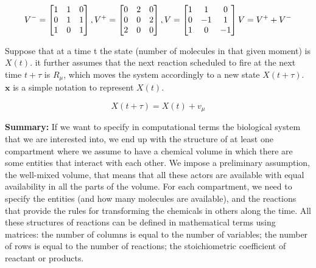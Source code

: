 $$ V^- = \begin{bmatrix}1 & 1 & 0 \\ 0 & 1&1 \\ 1&0&1 \end{bmatrix}, V^+ = \begin{bmatrix}0 & 2 & 0 \\ 0 & 0&2 \\ 2&0&0 \end{bmatrix}, V = \begin{bmatrix}1 & 1 & 0 \\ 0 & -1&1 \\ 1&0&-1 \end{bmatrix}\\ V = V^+ + V^- $$

Suppose that at a time t the state (number of molecules in that given moment) is $X(t)$.
it further assumes that the next reaction scheduled to fire at the next time $t + \tau$ is $R _\mu$, which moves the system accordingly to a new state $X(t + \tau)$.
$\mathbf{x}$ is a simple notation to represent $X(t)$.

$$ X(t+\tau) = X(t)+v_\mu $$

\textbf{Summary:} If we want to specify in computational terms the biological system that we are interested into, we end up with the structure of at least one compartment where we assume to have a chemical volume in which there are some entities that interact with each other.
We impose a preliminary assumption, the well-mixed volume, that means that all these actors are available with equal availability in all the parts of the volume.
For each compartment, we need to specify the entities (and how many molecules are available), and the reactions that provide the rules for transforming the chemicals in others along the time.
All these structures of reactions can be defined in mathematical terms using matrices: the number of columns is equal to the number of variables; the number of rows is equal to the number of reactions; the stoichiometric coefficient of reactant or products.

